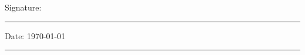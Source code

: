 \documentclass[11pt,oneside,english]{book}
\begin{document}
\noindent Signature:\\[1mm]
\rule[1em]{25em}{0.5pt}

\noindent Date: \today \\[1mm]
\rule[1em]{25em}{0.5pt}







\tableofcontents
\listoffigures
\listoftables



\mainmatter










\renewcommand{\bibname}{References}


 



% 
% 
\end{document}
